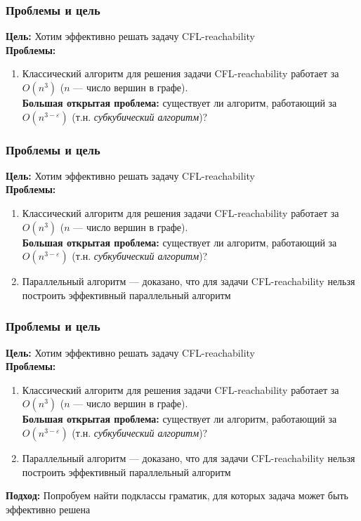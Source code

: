 \documentclass{beamer}
\begin{document}
\begin{frame}
\frametitle{Проблемы и цель}
\textbf{Цель:} Хотим эффективно решать задачу CFL-reachability
\\
\textbf{Проблемы:} 
\begin{enumerate}
\item Классический алгоритм для решения задачи CFL-reachability работает за $O(n^3)$ ($n$ --- число вершин в графе).
\\\textbf{Большая открытая проблема:} существует ли алгоритм, работающий за $O(n^{3-\varepsilon})$ (т.н. \textit{субкубический алгоритм})?

\end{enumerate}
\end{frame}

\begin{frame}
\frametitle{Проблемы и цель}
\textbf{Цель:} Хотим эффективно решать задачу CFL-reachability
\\ 
\textbf{Проблемы:} 
\begin{enumerate}
\item Классический алгоритм для решения задачи CFL-reachability работает за $O(n^3)$ ($n$ --- число вершин в графе).
\\\textbf{Большая открытая проблема:} существует ли алгоритм, работающий за $O(n^{3-\varepsilon})$ (т.н. \textit{субкубический алгоритм})?
\item Параллельный алгоритм --- доказано, что для задачи CFL-reachability нельзя построить эффективный параллельный алгоритм

\end{enumerate}
\end{frame}

\begin{frame}
\frametitle{Проблемы и цель}
\textbf{Цель:} Хотим эффективно решать задачу CFL-reachability
\\ 
\textbf{Проблемы:} 
\begin{enumerate}
\item Классический алгоритм для решения задачи CFL-reachability работает за $O(n^3)$ ($n$ --- число вершин в графе).
\\\textbf{Большая открытая проблема:} существует ли алгоритм, работающий за $O(n^{3-\varepsilon})$ (т.н. \textit{субкубический алгоритм})?
\item Параллельный алгоритм --- доказано, что для задачи CFL-reachability нельзя построить эффективный параллельный алгоритм

\end{enumerate}
\textbf{Подход:} Попробуем найти подклассы граматик, для которых задача может быть эффективно решена



\end{frame}
\end{document}
